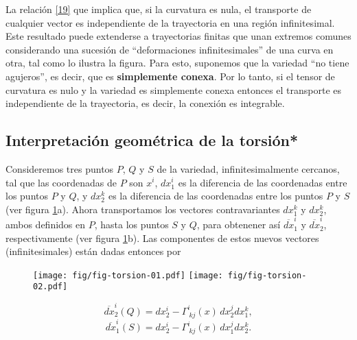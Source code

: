 La relación \eqref{19} que implica que, si la curvatura es nula, el transporte de cualquier vector es independiente de la trayectoria en una región infinitesimal. Este resultado puede extenderse a trayectorias finitas que unan extremos comunes considerando una sucesión de ``deformaciones infinitesimales'' de una curva en otra, tal como lo ilustra la figura. Para esto, suponemos que la variedad ``no tiene agujeros'', es decir, que es \textbf{simplemente conexa}. Por lo tanto, si el tensor de curvatura es nulo y la variedad es simplemente conexa entonces el transporte es independiente de la trayectoria, es decir, la conexión es integrable.

\subsection{Interpretación geométrica de la torsión*}
Consideremos tres puntos $P$, $Q$ y $S$ de la variedad, infinitesimalmente
cercanos, tal que las coordenadas de $P$ son $x^i $, $dx_1^i $ es la
diferencia de las coordenadas entre los puntos $P$ y $Q$, y $dx_2^k $ es la
diferencia de las coordenadas entre los puntos $P$ y $S$ (ver figura \ref{fig:torsion}a). 
Ahora transportamos los vectores contravariantes $dx_1^k $ y $dx_2^k $, ambos definidos en $P$, hasta los puntos $S$ y $Q$, para obtenener así $\overline{dx}^i_1$ y $\overline{dx}^i_2$, respectivamente (ver figura \ref{fig:torsion}b). Las componentes de estos nuevos vectores (infinitesimales) están dadas entonces por
\begin{center}
\begin{figure}[H]
\centerline{\texttt{[image: fig/fig-torsion-01.pdf]}
\hspace{1cm}\texttt{[image: fig/fig-torsion-02.pdf]}}
\caption{}
\label{fig:torsion}
\end{figure}
\end{center}
\begin{equation}
\overline{dx}_2^i (Q)=dx_2^i -\Gamma_{\ kj}^i(x)\, dx_2^j dx_1^k ,
\end{equation}
\begin{equation}
\overline{dx}_1^i (S)=dx_2^i -\Gamma_{\ kj}^i(x)\, dx_1^j dx_2^k .
\end{equation}

